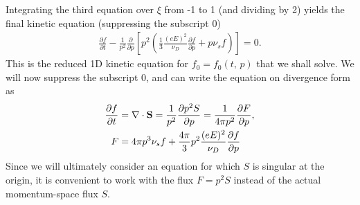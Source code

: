 \documentclass[11pt,a4paper]{article}
\renewcommand{\b}[1]{\ensuremath{ {\bf #1 } }}
\begin{document}
Integrating the third equation over $\xi$ from -1 to 1 (and dividing by 2) yields the final kinetic equation (suppressing the subscript $0$)
\begin{align}
\frac{\partial f}{\partial t} - \frac{1}{p^2}\frac{\partial}{\partial p} \left[ p^2\left( \frac{1}{3}\frac{(eE)^2}{\nu_D}\frac{\partial f}{\partial p} + p \nu_s  f \right)\right] = 0.
\end{align}
This is the reduced 1D kinetic equation for $f_0 = f_0(t,\,p)$ that we shall solve. We will now suppress the subscript 0, and can write the equation on divergence form as 
\begin{align}
\frac{\partial f}{\partial t} &= \nabla \cdot \b{S} = \frac{1}{p^2}\frac{\partial p^2 S}{\partial p} = \frac{1}{4\pi p^2}\frac{\partial F}{\partial p}, 
\label{eq:kinetic eq} \\
F &=  4\pi p^3 \nu_s  f +  \frac{4\pi}{3}p^2\frac{(eE)^2}{\nu_D}\frac{\partial f}{\partial p} 
\end{align}
Since we will ultimately consider an equation for which $S$ is singular at the origin, it is convenient to work with the flux $F=p^2 S$ instead of the actual momentum-space flux $S$. 
\end{document}

